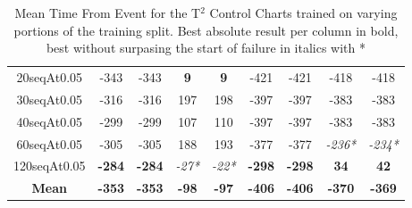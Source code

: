\documentclass[12pt]{article}
\begin{document}
\begin{table}[h]
\begin{tabular}{|c|cc|cc|cc|cc|}
        20seqAt0.05     & -343          & -343          & \textbf{9}    & \textbf{9}    & -421          & -421          & -418           & -418           \\
        30seqAt0.05     & -316          & -316          & 197           & 198           & -397          & -397          & -383           & -383           \\
        40seqAt0.05     & -299          & -299          & 107           & 110           & -397          & -397          & -383           & -383           \\
        60seqAt0.05     & -305          & -305          & 188           & 193           & -377          & -377          & \textit{-236*} & \textit{-234*} \\
        120seqAt0.05    & \textbf{-284} & \textbf{-284} & \textit{-27*} & \textit{-22*} & \textbf{-298} & \textbf{-298} & \textbf{34}    & \textbf{42}    \\ \hline
        \textbf{Mean}   & \textbf{-353} & \textbf{-353} & \textbf{-98}  & \textbf{-97}  & \textbf{-406} & \textbf{-406} & \textbf{-370}  & \textbf{-369}  \\ \hline
    \end{tabular}
    \caption{Mean Time From Event for the T$^2$ Control Charts trained on varying portions of the training split. Best absolute result per column in bold, best without surpasing the start of failure in italics with *}
\end{table}
\end{document}
